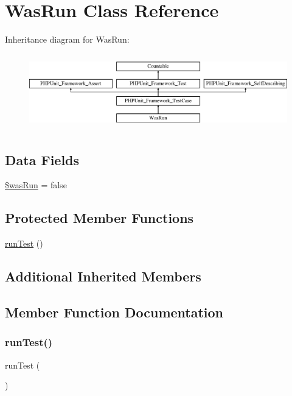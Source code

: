 \hypertarget{class_was_run}{}\section{Was\+Run Class Reference}
\label{class_was_run}
Inheritance diagram for Was\+Run\+:\begin{figure}[H]
\begin{center}
\leavevmode
\includegraphics[height=3.303835cm]{class_was_run}
\end{center}
\end{figure}
\subsection*{Data Fields}
\begin{DoxyCompactItemize}
\item 
\mbox{\hyperlink{class_was_run_a49ad800442afbc0601e90dd0a4116765}{\$was\+Run}} = false
\end{DoxyCompactItemize}
\subsection*{Protected Member Functions}
\begin{DoxyCompactItemize}
\item 
\mbox{\hyperlink{class_was_run_ad2541a093be4d619db04ed65d661a684}{run\+Test}} ()
\end{DoxyCompactItemize}
\subsection*{Additional Inherited Members}


\subsection{Member Function Documentation}
\mbox{\label{class_was_run_ad2541a093be4d619db04ed65d661a684}} 
\subsubsection{\texorpdfstring{run\+Test()}{runTest()}}
{\footnotesize\ttfamily run\+Test (\begin{DoxyParamCaption}{ }\end{DoxyParamCaption})\hspace{0.3cm}{\ttfamily [protected]}}



